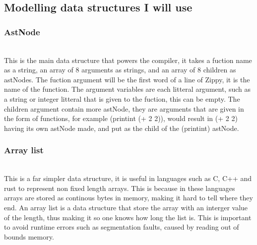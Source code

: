 \documentclass[a4paper,12pt]{article}
\begin{document}
{\subsection{Modelling data structures I will use}
\subsubsection{AstNode}
\\
This is the main data structure that powers the compiler, it takes a fuction name as a string, an array of 8 arguments as
strings, and an array of 8 children as astNodes. The fuction argument will be the first word of a line of Zippy, it is the 
name of the function. The argument variables are each litteral argument, such as a string or integer litteral that is given
to the fuction, this can be empty. The children argument contain more astNode, they are arguments that are given in the 
form of functions, for example (printint (+ 2 2)), would result in (+ 2 2) having its own astNode made, and put as the child
of the (printint) astNode.

\subsubsection{Array list}
\\
This is a far simpler data structure, it is useful in languages such as C, C++ and rust to represent non fixed length
arrays. This is because in these languages arrays are stored as continous bytes in memory, making it hard to tell where
they end. An array list is a data structure that store the array with an interger value of the length, thus making it
so one knows how long the list is. This is important to avoid runtime errors such as segmentation faults, caused by 
reading out of bounds memory.

}
\end{document}
